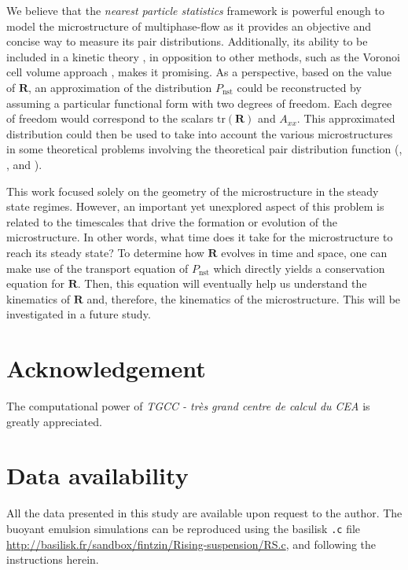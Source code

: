 We believe that the \textit{nearest particle statistics} framework is powerful enough to model the microstructure of multiphase-flow as it provides an objective and concise way to measure its pair distributions. 
Additionally, its ability to be included in a kinetic theory \citep{zhang2023evolution}, in opposition to other methods,  such as the Voronoi cell volume approach \citep{senthil2005voronoi}, makes it promising. As a perspective, based on the value of $\textbf{R}$, an approximation of the distribution $P_\text{nst}$ could be reconstructed by assuming a particular functional form with two degrees of freedom.
Each degree of freedom would correspond to the scalars $\text{tr}(\textbf{R})$ and $A_{xx}$.
This approximated distribution could then be used to take into account the various microstructures in some theoretical problems involving the theoretical pair distribution function (\citet{batchelor1972sedimentation}, \citet{hinch1977averaged,wang1999longitudinal}, and \citet{zhang2021ensemble}).

This work focused solely on the geometry of the microstructure in the steady state regimes. 
However, an important yet unexplored aspect of this problem is related to the timescales that drive the formation or evolution of the microstructure. 
In other words, what time does it take for the microstructure to reach its steady state? 
To determine how $\textbf{R}$ evolves in time and space, one can make use of the transport equation of $P_\text{nst}$ which directly yields a conservation equation for $\textbf{R}$. 
Then, this equation will eventually help us understand the kinematics   of $\textbf{R}$ and, therefore, the kinematics   of the microstructure. 
This will be investigated in a future study. 

 

\section*{Acknowledgement}

The computational power of  \textit{TGCC - tr\`es grand centre de calcul du CEA} is greatly appreciated. 
\section*{Data availability}

All the data presented in this study are available upon request to the author. 
The buoyant emulsion simulations can be reproduced using the basilisk \texttt{.c} file \url{http://basilisk.fr/sandbox/fintzin/Rising-suspension/RS.c}, and following the instructions herein. 
